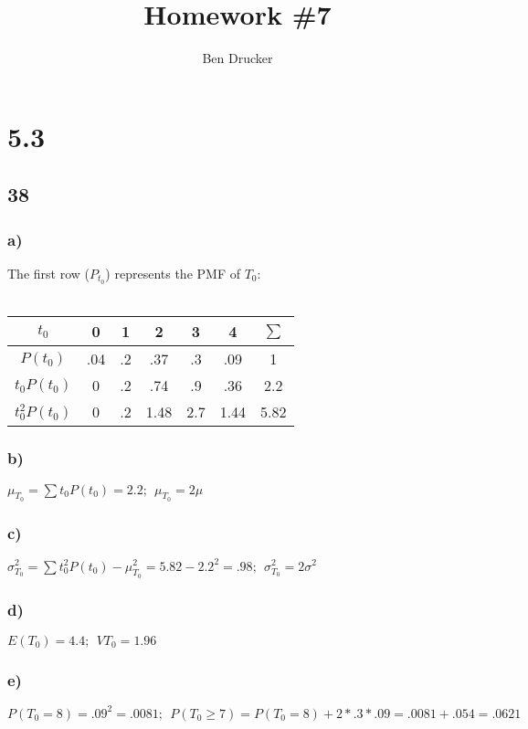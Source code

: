 \documentclass{article}
\newcommand{\hwkNum}{7}
\newcommand{\hwkAuthors}{Ben Drucker}
\begin{document}
\title{Homework \#\hwkNum}
\author{\hwkAuthors}
\date{}

\maketitle


\section*{5.3}
	\subsection*{38}
		\subsubsection*{a)} The first row ($P_{t_0}$) represents the PMF of $T_0$: \\ \\
			\begin{tabular}{c || c | c | c | c | c | c}
				\hline
				$t_0$ & 0 & 1 & 2 & 3 & 4 & $\sum$\\ \hline \hline
				$P(t_0)$ & .04 & .2 & .37 & .3  & .09 & 1 \\ \hline
				$t_0P(t_0)$ & 0 & .2 & .74 & .9 & .36 & 2.2\\ \hline
				$t_0^2P(t_0)$ & 0 & .2 & 1.48 & 2.7 & 1.44 & 5.82\\
				\hline				
			\end{tabular}
		\subsubsection*{b)}
			$\mu_{T_0} = \sum t_0 P(t_0) = 2.2;~~ \mu_{T_0} = 2\mu $
		\subsubsection*{c)}
			$\sigma^2_{T_0} = \sum t_0^2 P(t_0) - \mu_{T_0}^2 = 5.82 - 2.2^2 = .98;~~ \sigma^2_{T_0} = 2\sigma^2$	 	
		\subsubsection*{d)}
			$E(T_0) = 4.4;~~ V{T_0} = 1.96$
		\subsubsection*{e)}
			$P(T_0 = 8) = .09^2 = .0081; ~~ P(T_0 \geq 7) = P(T_0 = 8) + 2*.3*.09 = .0081 + .054 = .0621$
\end{document}
